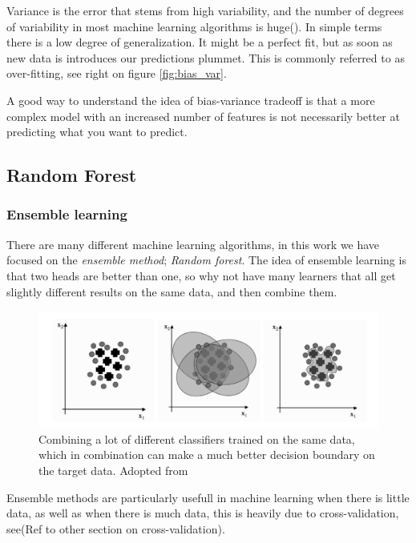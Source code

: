 Variance is the error that stems from high variability, and the number of degrees of variability in most machine learning algorithms is huge(\cite{marsland2014machine}). In simple terms there is a low degree of generalization. It might be a perfect fit, but as soon as new data is introduces our predictions plummet. This is commonly referred to as over-fitting, see right on figure \ref{fig:bias_var}. 

A good way to understand the idea of bias-variance tradeoff is that a more complex model with an increased number of features is not necessarily better at predicting what you want to predict. 


\subsection{Random Forest}

\subsubsection{Ensemble learning}
	There are many different machine learning algorithms, in this work we have focused on the \textit{ensemble method}; \textit{Random forest}\cite{breiman2001random}. The idea of ensemble learning is that two heads are better than one, so why not have many learners that all get slightly different results on the same data, and then combine them.  
	
\begin{figure}[H]
     \centering
     \includegraphics[width=\linewidth]{theory/figures/ensemble_learning.png}
     \caption{Combining a lot of different classifiers trained on the same data, which in combination can make a much better decision boundary on the target data. Adopted from \cite{marsland2014machine}}
     \label{fig:ensemble_learning}
\end{figure}	

Ensemble methods are particularly usefull in machine learning when there is little data, as well as when there is much data, this is heavily due to cross-validation, see(Ref to other section on cross-validation). 


